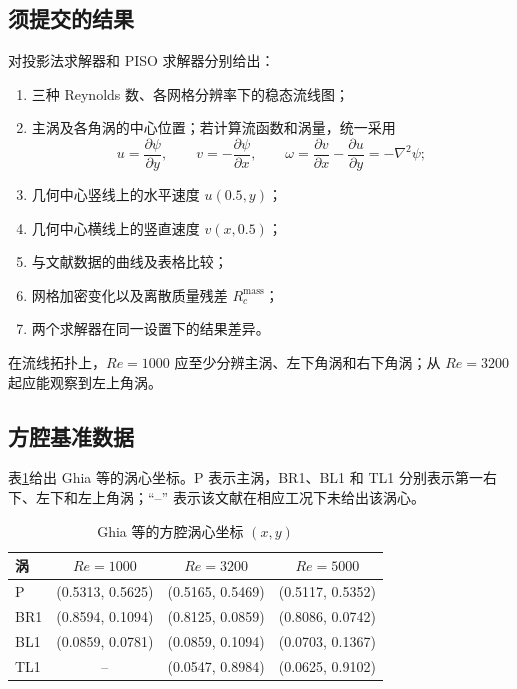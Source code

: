 \documentclass[UTF8,a4paper,11pt]{ctexart}
\begin{document}
\subsection{须提交的结果}

对投影法求解器和 PISO 求解器分别给出：

\begin{enumerate}[label=\arabic*.]
  \item 三种 Reynolds 数、各网格分辨率下的稳态流线图；
  \item 主涡及各角涡的中心位置；若计算流函数和涡量，统一采用
  \[
    u=\frac{\partial\psi}{\partial y},\qquad
    v=-\frac{\partial\psi}{\partial x},\qquad
    \omega=\frac{\partial v}{\partial x}-\frac{\partial u}{\partial y}=-\nabla^2\psi;
  \]
  \item 几何中心竖线上的水平速度 \(u(0.5,y)\)；
  \item 几何中心横线上的竖直速度 \(v(x,0.5)\)；
  \item 与文献\cite{Ghia1982,Erturk2005}数据的曲线及表格比较；
  \item 网格加密变化以及离散质量残差 \(R_c^{\mathrm{mass}}\)；
  \item 两个求解器在同一设置下的结果差异。
\end{enumerate}

在流线拓扑上，\(Re=1000\) 应至少分辨主涡、左下角涡和右下角涡；从 \(Re=3200\) 起应能观察到左上角涡\cite{Ghia1982,Erturk2005}。

\subsection{方腔基准数据}

表\ref{tab:ghia-centres}给出 Ghia 等\cite{Ghia1982}的涡心坐标。P 表示主涡，BR1、BL1 和 TL1 分别表示第一右下、左下和左上角涡；``--'' 表示该文献在相应工况下未给出该涡心。

\begin{table}[htbp]
\centering
\caption{Ghia 等\cite{Ghia1982}的方腔涡心坐标 \((x,y)\)}
\label{tab:ghia-centres}
\begin{tabular}{lccc}
\toprule
涡 & \(Re=1000\) & \(Re=3200\) & \(Re=5000\) \\
\midrule
P   & (0.5313, 0.5625) & (0.5165, 0.5469) & (0.5117, 0.5352) \\
BR1 & (0.8594, 0.1094) & (0.8125, 0.0859) & (0.8086, 0.0742) \\
BL1 & (0.0859, 0.0781) & (0.0859, 0.1094) & (0.0703, 0.1367) \\
TL1 & --               & (0.0547, 0.8984) & (0.0625, 0.9102) \\
\bottomrule
\end{tabular}
\end{table}
\end{document}
